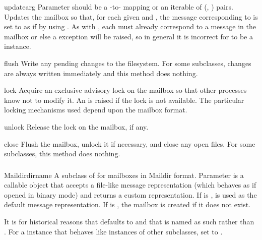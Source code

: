 \begin{methoddesc}{update}{arg}
Parameter  should be a -to- mapping or an
iterable of (, ) pairs. Updates the mailbox so that, for
each given  and , the message corresponding to 
is set to  as if by using . As with
, each  must already correspond to a message in
the mailbox or else a  exception will be raised, so in
general it is incorrect for  to be a  instance.
\end{methoddesc}

\begin{methoddesc}{flush}{}
Write any pending changes to the filesystem. For some 
subclasses, changes are always written immediately and this method does
nothing.
\end{methoddesc}

\begin{methoddesc}{lock}{}
Acquire an exclusive advisory lock on the mailbox so that other processes know
not to modify it. An  is raised if the lock is
not available. The particular locking mechanisms used depend upon the mailbox
format.
\end{methoddesc}

\begin{methoddesc}{unlock}{}
Release the lock on the mailbox, if any.
\end{methoddesc}

\begin{methoddesc}{close}{}
Flush the mailbox, unlock it if necessary, and close any open files. For some
 subclasses, this method does nothing.
\end{methoddesc}


\subsubsection{}
\label{mailbox-maildir}

\begin{classdesc}{Maildir}{dirname}
A subclass of  for mailboxes in Maildir format. Parameter
 is a callable object that accepts a file-like message
representation (which behaves as if opened in binary mode) and returns a custom
representation. If  is ,  is used
as the default message representation. If  is , the
mailbox is created if it does not exist.

It is for historical reasons that  defaults to
 and that  is named as such rather than
. For a  instance that behaves like instances of other
 subclasses, set  to .
\end{classdesc}

